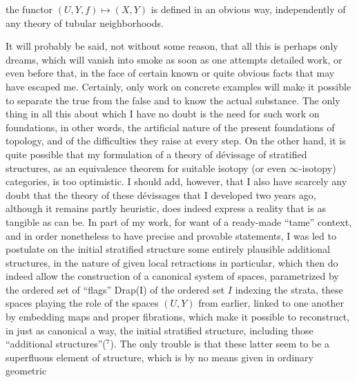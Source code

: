 
the functor $(U,Y,f) \longmapsto (X,Y)$ is defined in an obvious way,
independently of any theory of tubular neighborhoods.

It will probably be said, not without some reason, that all
this is perhaps only dreams, which will vanish into smoke as soon
as one attempts detailed work, or even before that,
in the face of certain known or quite obvious facts that may have
escaped me. Certainly, only work on concrete examples will make it possible to
separate the true from the false and to know the actual substance. The
only thing in all this about which I have no
doubt is the need for such work on foundations, in
other words, the artificial nature of the present foundations of
topology, and of the difficulties they raise at every
step. On the other hand, it is quite possible that my formulation
of a theory of dévissage of stratified structures, as
an equivalence theorem for suitable isotopy (or even
$\infty$-isotopy) categories, is too optimistic. I should add,
however, that I also have scarcely any doubt that the theory
of these dévissages that I developed two years ago, although
it remains partly heuristic, does indeed express a reality
that is as tangible as can be. In part of my work,
for want of a ready-made ``tame'' context, and
in order nonetheless to have precise and provable statements,
I was led to postulate on the initial stratified structure
some entirely plausible additional structures,
in the nature of given local retractions in particular,
which then do indeed allow the construction of a canonical system
of spaces, parametrized by the ordered set of ``flags'' Drap(I)
of the ordered set $I$ indexing the strata, these spaces playing
the role of the spaces $(U,Y)$ from earlier, linked to one another by
embedding maps and proper fibrations, which make it
possible to reconstruct, in just as canonical a way, the initial
stratified structure, including those ``additional structures''(${}^{7}$).
The only trouble is that these latter seem to be a superfluous element of
structure, which is by no means given in ordinary geometric

